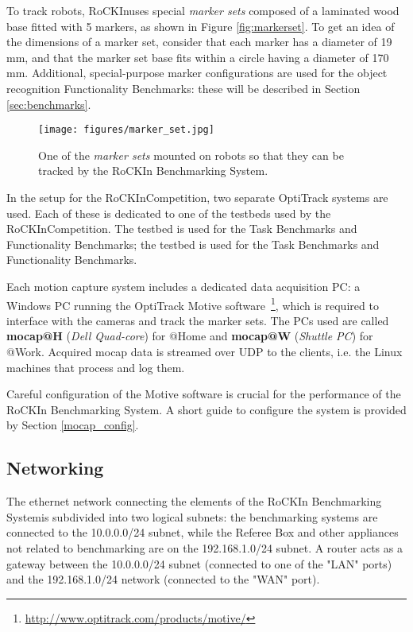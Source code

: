 \documentclass[a4paper]{article}
\newcommand{\ro}{RoCKIn}
\newcommand{\rbs}{RoCKIn Benchmarking System}
\begin{document}
To track robots, \ro uses special \textit{marker sets} composed of a laminated wood base fitted with 5 markers, as shown in Figure \ref{fig:markerset}. To get an idea of the dimensions of a marker set, consider that each marker has a diameter of 19 mm, and that the marker set base fits within a circle having a diameter of 170 mm. Additional, special-purpose marker configurations are used for the object recognition Functionality Benchmarks: these will be described in Section \ref{sec:benchmarks}.

\begin{figure}[h]
  \centering
  \texttt{[image: figures/marker\_set.jpg]}
  \caption{One of the \textit{marker sets} mounted on robots so that they can be tracked by the \rbs.}
\end{figure}
\label{fig:markerset}

In the setup for the \ro Competition, two separate OptiTrack systems are used. Each of these is dedicated to one of the testbeds used by the \ro Competition. The \ro@Home testbed is used for the \ro@Home Task Benchmarks and Functionality Benchmarks; the \ro@Work testbed is used for the \ro@Work Task Benchmarks and Functionality Benchmarks.

Each motion capture system includes a dedicated data acquisition PC: a Windows PC running the OptiTrack Motive software~\footnote{\url{http://www.optitrack.com/products/motive/}}, which is required to interface with the cameras and track the marker sets. The PCs used are called \textbf{mocap@H} (\textit{Dell Quad-core}) for @Home and \textbf{mocap@W} (\textit{Shuttle PC}) for @Work. Acquired mocap data is streamed over UDP to the clients, i.e. the Linux machines that process and log them.

Careful configuration of the Motive software is crucial for the performance of the \rbs. A short guide to configure the system is provided by Section \ref{mocap_config}.


\subsection{Networking}
The ethernet network connecting the elements of the \rbs is subdivided into two logical subnets: the benchmarking systems are connected to the 10.0.0.0/24 subnet, while the Referee Box and other appliances not related to benchmarking are on the 192.168.1.0/24 subnet.
A router acts as a gateway between the 10.0.0.0/24 subnet (connected to one of the "LAN" ports) and the 192.168.1.0/24 network (connected to the "WAN" port).
\end{document}
